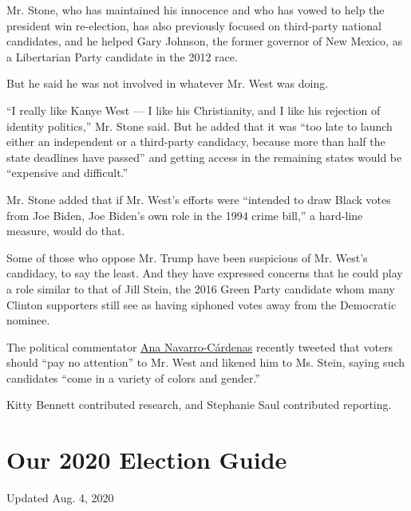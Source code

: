 Mr. Stone, who has maintained his innocence and who has vowed to help
the president win re-election, has also previously focused on
third-party national candidates, and he helped Gary Johnson, the former
governor of New Mexico, as a Libertarian Party candidate in the 2012
race.

But he said he was not involved in whatever Mr. West was doing.

``I really like Kanye West --- I like his Christianity, and I like his
rejection of identity politics,'' Mr. Stone said. But he added that it
was ``too late to launch either an independent or a third-party
candidacy, because more than half the state deadlines have passed'' and
getting access in the remaining states would be ``expensive and
difficult.''

Mr. Stone added that if Mr. West's efforts were ``intended to draw Black
votes from Joe Biden, Joe Biden's own role in the 1994 crime bill,'' a
hard-line measure, would do that.

Some of those who oppose Mr. Trump have been suspicious of Mr. West's
candidacy, to say the least. And they have expressed concerns that he
could play a role similar to that of Jill Stein, the 2016 Green Party
candidate whom many Clinton supporters still see as having siphoned
votes away from the Democratic nominee.

The political commentator \href{https://twitter.com/ananavarro}{Ana
Navarro-Cárdenas} recently tweeted that voters should ``pay no
attention'' to Mr. West and likened him to Ms. Stein, saying such
candidates ``come in a variety of colors and gender.''

Kitty Bennett contributed research, and Stephanie Saul contributed
reporting.

\hypertarget{our-2020-election-guide}{%
\section{Our 2020 Election Guide}\label{our-2020-election-guide}}

Updated Aug. 4, 2020


